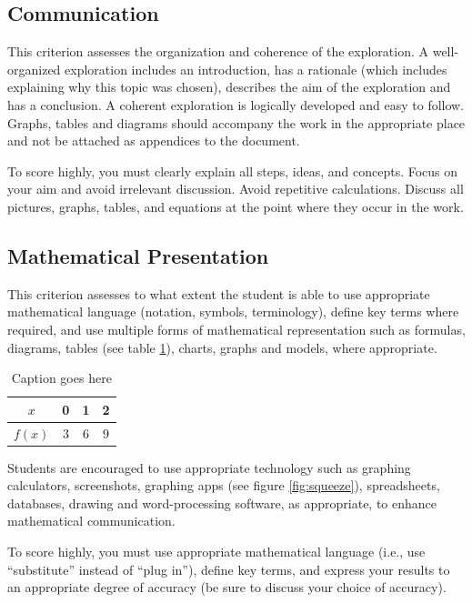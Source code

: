 \documentclass[11pt, letterpaper]{article}
\begin{document}
\subsection{Communication}
This criterion assesses the organization and coherence of the exploration. A well-organized exploration includes an introduction, has a rationale (which includes explaining why this topic was chosen), describes the aim of the exploration and has a conclusion. A coherent exploration is logically developed and easy to follow. Graphs, tables and diagrams should accompany the work in the appropriate place and not be attached as appendices to the document.\cite{DBHS2}

To score highly, you must clearly explain all steps, ideas, and concepts. Focus on your aim and avoid irrelevant discussion. Avoid repetitive calculations. Discuss all pictures, graphs, tables, and equations at the point where they occur in the work.

\subsection{Mathematical Presentation}
This criterion assesses to what extent the student is able to use appropriate mathematical language (notation, symbols, terminology), define key terms where required, and use multiple forms of mathematical representation such as formulas, diagrams, tables (see table \ref{tab:data1}), charts, graphs and models, where appropriate.

\begin{table}[H]
	\centering
		\begin{tabular}{|c | c | c | c |} \hline
			$x$ & 0 & 1 & 2\\ \hline
			$f(x)$ & 3 & 6 & 9\\ \hline
		\end{tabular}
	\caption{Caption goes here \protect\footnotemark}
	\label{tab:data1} %
\end{table}

Students are encouraged to use appropriate technology such as graphing calculators, screenshots, graphing apps (see 
figure \ref{fig:squeeze}), spreadsheets, databases, drawing and word-processing software, as appropriate, to
enhance mathematical communication.

To score highly, you must use appropriate mathematical language (i.e., use ``substitute'' instead of ``plug in''), 
define key terms, and express your results to an appropriate degree of accuracy (be sure to discuss your choice of 
accuracy).
\end{document}
